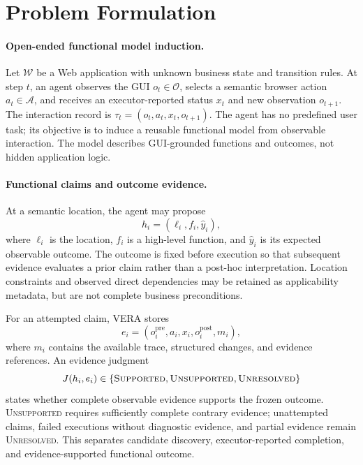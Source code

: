 \section{Problem Formulation}
\label{sec:problem-formulation}

\paragraph{Open-ended functional model induction.}
Let $\mathcal{W}$ be a Web application with unknown business state and
transition rules. At step $t$, an agent observes the GUI $o_t\in\mathcal{O}$,
selects a semantic browser action $a_t\in\mathcal{A}$, and receives an
executor-reported status $x_t$ and new observation $o_{t+1}$. The interaction
record is $\tau_t=(o_t,a_t,x_t,o_{t+1})$. The agent has no predefined user task;
its objective is to induce a reusable functional model from observable
interaction. The model describes GUI-grounded functions and outcomes, not
hidden application logic.

\paragraph{Functional claims and outcome evidence.}
At a semantic location, the agent may propose
\begin{equation}
    h_i=(\ell_i,f_i,\hat{y}_i),
\end{equation}
where $\ell_i$ is the location, $f_i$ is a high-level function, and
$\hat{y}_i$ is its expected observable outcome. The outcome is fixed before
execution so that subsequent evidence evaluates a prior claim rather than a
post-hoc interpretation. Location constraints and observed direct dependencies
may be retained as applicability metadata, but are not complete business
preconditions.

For an attempted claim, VERA stores
\begin{equation}
    e_i=(o_i^{\mathrm{pre}},a_i,x_i,o_i^{\mathrm{post}},m_i),
\end{equation}
where $m_i$ contains the available trace, structured changes, and evidence
references. An evidence judgment
\begin{equation}
    J(h_i,e_i)\in\{\textsc{Supported},\textsc{Unsupported},
    \textsc{Unresolved}\}
\end{equation}
states whether complete observable evidence supports the frozen outcome.
\textsc{Unsupported} requires sufficiently complete contrary evidence;
unattempted claims, failed executions without diagnostic evidence, and partial
evidence remain \textsc{Unresolved}. This separates candidate discovery,
executor-reported completion, and evidence-supported functional outcome.

